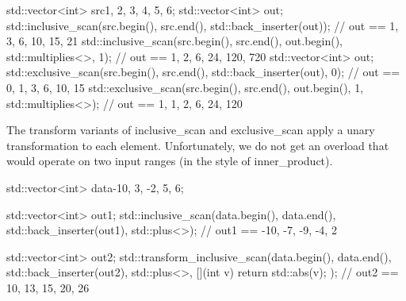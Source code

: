\begin{box-note}
\begin{cppcode}
std::vector<int> src{1, 2, 3, 4, 5, 6};
{
    std::vector<int> out;
    std::inclusive_scan(src.begin(), src.end(), std::back_inserter(out));
    // out == {1, 3, 6, 10, 15, 21}
    std::inclusive_scan(src.begin(), src.end(), out.begin(), std::multiplies<>{}, 1);
    // out == {1, 2, 6, 24, 120, 720}
}
{
    std::vector<int> out;
    std::exclusive_scan(src.begin(), src.end(), std::back_inserter(out), 0);
    // out == {0, 1, 3, 6, 10, 15}
    std::exclusive_scan(src.begin(), src.end(), out.begin(), 1, std::multiplies<>{});
    // out == {1, 1, 2, 6, 24, 120}
}
\end{cppcode}
\end{box-note}



The transform variants of inclusive\_scan and exclusive\_scan apply a unary transformation to each element. Unfortunately, we do not get an overload that would operate on two input ranges (in the style of inner\_product).

\begin{box-note}
\begin{cppcode}
std::vector<int> data{-10, 3, -2, 5, 6};

std::vector<int> out1;
std::inclusive_scan(data.begin(), data.end(), std::back_inserter(out1), 
                    std::plus<>{});
// out1 == {-10, -7, -9, -4, 2}

std::vector<int> out2;
std::transform_inclusive_scan(data.begin(), data.end(), std::back_inserter(out2), 
                              std::plus<>{}, [](int v) { return std::abs(v); });
// out2 == {10, 13, 15, 20, 26}
\end{cppcode}
\end{box-note}


